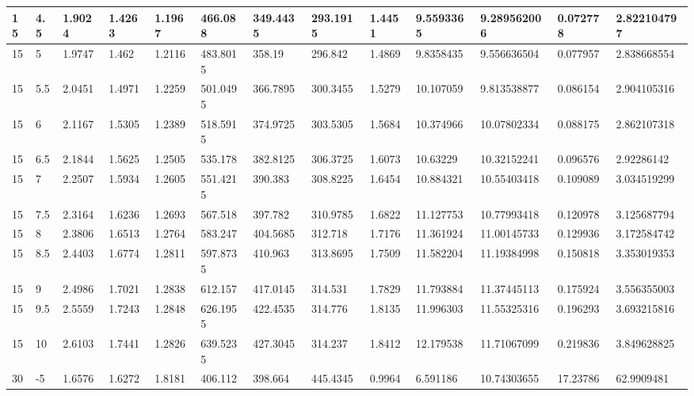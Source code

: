 \begin{longtable}{|l|l|l|l|l|l|l|l|l|l|l|l|l|}
15    & 4.5   & 1.9024  & 1.4263  & 1.1967  & 466.088  & 349.4435 & 293.1915 & 1.4451   & 9.5593365   & 9.289562006    & 0.072778                 & 2.822104797 \\ \hline
15    & 5     & 1.9747  & 1.462   & 1.2116  & 483.8015 & 358.19   & 296.842  & 1.4869   & 9.8358435   & 9.556636504    & 0.077957                 & 2.838668554 \\ \hline
15    & 5.5   & 2.0451  & 1.4971  & 1.2259  & 501.0495 & 366.7895 & 300.3455 & 1.5279   & 10.107059   & 9.813538877    & 0.086154                 & 2.904105316 \\ \hline
15    & 6     & 2.1167  & 1.5305  & 1.2389  & 518.5915 & 374.9725 & 303.5305 & 1.5684   & 10.374966   & 10.07802334    & 0.088175                 & 2.862107318 \\ \hline
15    & 6.5   & 2.1844  & 1.5625  & 1.2505  & 535.178  & 382.8125 & 306.3725 & 1.6073   & 10.63229    & 10.32152241    & 0.096576                 & 2.92286142  \\ \hline
15    & 7     & 2.2507  & 1.5934  & 1.2605  & 551.4215 & 390.383  & 308.8225 & 1.6454   & 10.884321   & 10.55403418    & 0.109089                 & 3.034519299 \\ \hline
15    & 7.5   & 2.3164  & 1.6236  & 1.2693  & 567.518  & 397.782  & 310.9785 & 1.6822   & 11.127753   & 10.77993418    & 0.120978                 & 3.125687794 \\ \hline
15    & 8     & 2.3806  & 1.6513  & 1.2764  & 583.247  & 404.5685 & 312.718  & 1.7176   & 11.361924   & 11.00145733    & 0.129936                 & 3.172584742 \\ \hline
15    & 8.5   & 2.4403  & 1.6774  & 1.2811  & 597.8735 & 410.963  & 313.8695 & 1.7509   & 11.582204   & 11.19384998    & 0.150818                 & 3.353019353 \\ \hline
15    & 9     & 2.4986  & 1.7021  & 1.2838  & 612.157  & 417.0145 & 314.531  & 1.7829   & 11.793884   & 11.37445113    & 0.175924                 & 3.556355003 \\ \hline
15    & 9.5   & 2.5559  & 1.7243  & 1.2848  & 626.1955 & 422.4535 & 314.776  & 1.8135   & 11.996303   & 11.55325316    & 0.196293                 & 3.693215816 \\ \hline
15    & 10    & 2.6103  & 1.7441  & 1.2826  & 639.5235 & 427.3045 & 314.237  & 1.8412   & 12.179538   & 11.71067099    & 0.219836                 & 3.849628825 \\ \hline
30    & -5    & 1.6576  & 1.6272  & 1.8181  & 406.112  & 398.664  & 445.4345 & 0.9964   & 6.591186    & 10.74303655    & 17.23786                 & 62.9909481  \\ \hline

\end{longtable}
